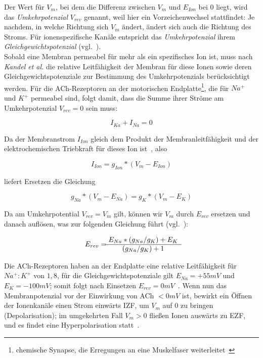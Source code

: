 {{{Der Wert für $V_m$, bei dem die Differenz zwischen $V_m$ und $E_{Ion}$ bei $0$ liegt, wird das \textit{Umkehrpotenzial} $V_{rev}$ genannt, weil hier ein Vorzeichenwechsel stattfindet: Je nachdem, in welche Richtung sich $V_m$ ändert, ändert sich auch die Richtung des Stroms.
Für ionenspezifische Kanäle entspricht das \textit{Umkehrpotenzial} ihrem \textit{Gleichgewichtspotenzial} (vgl.~\cite[95 f.]{SBB+13}).\\

Sobald eine Membran permeabel für mehr als ein spezifisches Ion ist, muss nach \textit{Kandel et al.} die relative Leitfähigkeit der Membran für diese Ionen sowie deren Gleichgewichtspotenziale zur Bestimmung des Umkehrpotenzials berücksichtigt werden.
Für die ACh-Rezeptoren an der motorischen Endplatte\footnote{
 chemische Synapse, die Erregungen an eine Muskelfaser weiterleitet~\cite[56]{SD07}
}, die für $Na^+$ und $K^+$ permeabel sind, folgt damit, dass die Summe ihrer Ströme am Umkehrpotenzial $V_{rev} = 0$ sein muss:

\begin{equation}
I_{Ka} + I_{Na} = 0
\end{equation}

Da der Membranstrom $I_{Ion}$ gleich dem Produkt der Membranleitfähigkeit und der elektrochemischen Triebkraft für dieses Ion ist~\cite[93]{BCP18}, also

\begin{equation}
I_{Ion} = g_{Ion} * (V_m - E_{Ion})
\end{equation}

liefert Ersetzen die Gleichung

\begin{equation}
g_{Na} * (V_m - E_{Na}) = g_{K} * (V_m - E_{K})
\end{equation}

Da am Umkehrpotential $V_{rev} = V_m$ gilt, können wir $V_m$ durch $E_{rev}$ ersetzen und danach auflösen, was zur folgenden Gleichung führt (vgl.~\cite[196, Box 9-1]{KSJ+13}):

\begin{equation}
E_{rev} = \begin{matrix}
            E_{Na} \space * \space (g_{Na} \space / \space g_{K}) \space + \space E_{K}  \\ \hline
            (g_{Na} \space / \space g_{K}) \space + 1
\end{matrix}
\end{equation}

Die ACh-Rezeptoren haben an der Endplatte eine relative Leitfähigkeit für $Na^+:K^+$ von $1,8$, für die Gleichgewichtspotenziale gilt $E_{Na} = +55 mV$ und $E_{K} = -100 mV$; somit folgt nach Einsetzen $E_{rev} = 0mV$~\cite[100]{HS19a}.
Wenn nun das Membranpotenzial vor der Einwirkung von ACh $< 0mV$ ist, bewirkt ein Öffnen der Ionenkanäle einen Strom einwärts IZF, um $V_m$ auf $0$ zu bringen (Depolarisation); im umgekehrten Fall $V_m > 0$ fließen Ionen auswärts zu EZF, und es findet eine Hyperpolarisation statt~\cite[136, Exkurs 5.4]{BCP18}.\\

}}}
